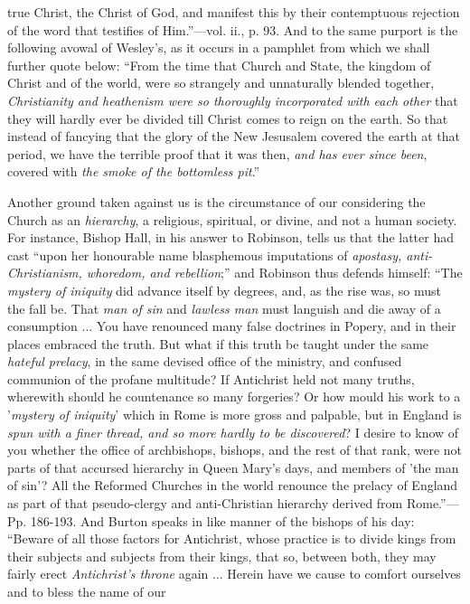 true Christ, the Christ of God, and manifest this by their contemptuous rejection of the word that testifies of Him.''—vol.
ii., p. 93. And to the same purport is the following avowal of Wesley's,
as it occurs in a pamphlet from which we shall further quote below:
``From the time that Church and State, the kingdom of Christ and
of the world, were so strangely and unnaturally blended together, \emph{Christianity
and heathenism were so thoroughly incorporated with each other}
that they will hardly ever be divided till Christ comes to reign on
the earth. So that instead of fancying that the glory of the New
Jesusalem covered the earth at that period, we have the terrible proof
that it was then, \emph{and has ever since been}, covered with \emph{the
smoke of the bottomless pit}.''

Another ground taken against us is the circumstance of our
considering the Church as an \emph{hierarchy}, a religious, spiritual,
or divine, and not a human society. For instance, Bishop Hall, in his
answer to Robinson, tells us that the latter had cast ``upon her
honourable name blasphemous imputations of \emph{apostasy, anti-Christianism,
whoredom, and rebellion};'' and Robinson thus defends himself:
``The \emph{mystery of iniquity} did advance itself by degrees,
and, as the rise was, so must the fall be. That \emph{man of sin} and \emph{lawless
man} must languish and die away of a consumption ... You have
renounced many false doctrines in Popery, and in their places embraced
the truth. But what if this truth be taught under the same \emph{hateful
prelacy}, in the same devised office of the ministry, and confused
communion of the profane multitude? If Antichrist held not many
truths, wherewith should he countenance so many forgeries? Or how
mould his work to a '\emph{mystery of iniquity}' which in Rome is more
gross and palpable, but in England is \emph{spun with a finer thread, and
so more hardly to be discovered}? I desire to know of you whether
the office of archbishops, bishops, and the rest of that rank,
were not parts of that accursed hierarchy in Queen Mary's days, and
members of 'the man of sin'? All the Reformed Churches in the world
renounce the prelacy of England as part of that pseudo-clergy and
anti-Christian hierarchy derived from Rome.''—Pp. 186-193. And
Burton speaks in like manner of the bishops of his day: ``Beware
of all those factors for Antichrist, whose practice is to divide kings
from their subjects and subjects from their kings, that so, between
both, they may fairly erect \emph{Antichrist's throne} again ...
Herein have we cause to comfort ourselves and to bless the name of our
